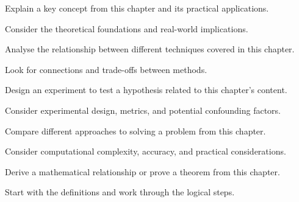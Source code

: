 \begin{exercisebox}[hard]
\begin{problem}
Explain a key concept from this chapter and its practical applications.
\end{problem}
\begin{hintbox}
Consider the theoretical foundations and real-world implications.
\end{hintbox}
\end{exercisebox}


\begin{exercisebox}[hard]
\begin{problem}
Analyse the relationship between different techniques covered in this chapter.
\end{problem}
\begin{hintbox}
Look for connections and trade-offs between methods.
\end{hintbox}
\end{exercisebox}


\begin{exercisebox}[hard]
\begin{problem}
Design an experiment to test a hypothesis related to this chapter's content.
\end{problem}
\begin{hintbox}
Consider experimental design, metrics, and potential confounding factors.
\end{hintbox}
\end{exercisebox}


\begin{exercisebox}[hard]
\begin{problem}
Compare different approaches to solving a problem from this chapter.
\end{problem}
\begin{hintbox}
Consider computational complexity, accuracy, and practical considerations.
\end{hintbox}
\end{exercisebox}


\begin{exercisebox}[hard]
\begin{problem}
Derive a mathematical relationship or prove a theorem from this chapter.
\end{problem}
\begin{hintbox}
Start with the definitions and work through the logical steps.
\end{hintbox}
\end{exercisebox}


